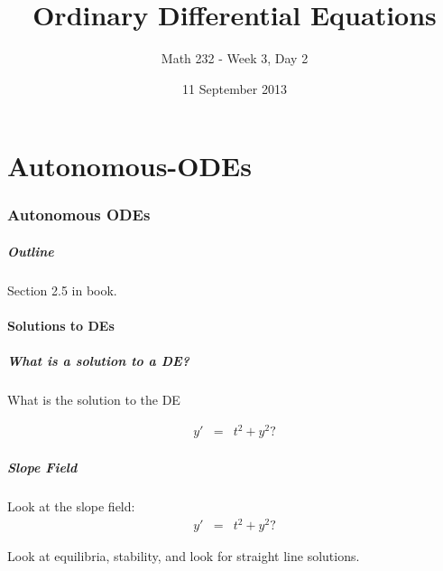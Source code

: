 \part{Autonomous-ODEs}
\section{Autonomous ODEs}

\title{Ordinary Differential Equations}
\subtitle{Math 232 - Week 3, Day 2}
\date{11 September 2013}

\begin{frame}
  \titlepage
\end{frame}

\begin{frame}
  \frametitle{Outline}
  \tableofcontents[hideothersubsections]

  Section 2.5 in book.
\end{frame}


\subsection{Solutions to DEs}


\begin{frame}
  \frametitle{What is a solution to a DE?}

  What is the solution to the DE

  \begin{eqnarray*}
    y' & = & t^2 + y^2?
  \end{eqnarray*}



\end{frame}


\begin{frame}
  \frametitle{Slope Field}

  Look at the slope field:
  \begin{eqnarray*}
    y' & = & t^2 + y^2?
  \end{eqnarray*}


  Look at equilibria, stability, and look for straight line solutions.

\end{frame}



